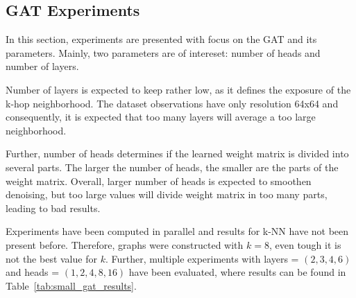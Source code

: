 \subsection{GAT Experiments}
In this section, experiments are presented with focus on the GAT and its parameters.
Mainly, two parameters are of intereset: number of heads and number of layers.

Number of layers is expected to keep rather low, as it defines the exposure of the k-hop neighborhood.
The dataset observations have only resolution 64x64 and consequently, it is expected that too many layers will 
average a too large neighborhood.

Further, number of heads determines if the learned weight matrix is divided into several parts.
The larger the number of heads, the smaller are the parts of the weight matrix.
Overall, larger number of heads is expected to smoothen denoising, but too large values
will divide weight matrix in too many parts, leading to bad results.

Experiments have been computed in parallel and results for k-NN have not been present before. 
Therefore, graphs were constructed with $k=8$, even tough it is not the best value for $k$.
Further, multiple experiments with layers = $(2,3,4,6)$ and heads = $(1,2,4,8,16)$ have been evaluated, 
where results can be found in Table~\ref{tab:small_gat_results}.

